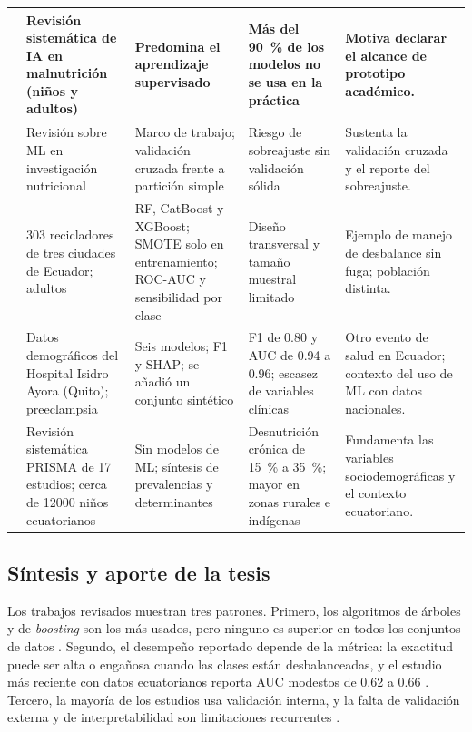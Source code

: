 \begin{longtable}{|R{1.1cm}|R{2.7cm}|R{2.9cm}|R{2.7cm}|R{2.7cm}|}
  \cite{JANSSEN2024100264} & Revisión sistemática de IA en malnutrición (niños y adultos) & Predomina el aprendizaje supervisado & Más del \SI{90}{\percent} de los modelos no se usa en la práctica & Motiva declarar el alcance de prototipo académico.\\ \hline
  \cite{KIRK20222573} & Revisión sobre ML en investigación nutricional & Marco de trabajo; validación cruzada frente a partición simple & Riesgo de sobreajuste sin validación sólida & Sustenta la validación cruzada y el reporte del sobreajuste.\\ \hline
  \cite{ijerph23020240} & \num{303} recicladores de tres ciudades de Ecuador; adultos & RF, CatBoost y XGBoost; SMOTE solo en entrenamiento; ROC-AUC y sensibilidad por clase & Diseño transversal y tamaño muestral limitado & Ejemplo de manejo de desbalance sin fuga; población distinta.\\ \hline
  \cite{diagnostics16142147} & Datos demográficos del Hospital Isidro Ayora (Quito); preeclampsia & Seis modelos; F1 y SHAP; se añadió un conjunto sintético & F1 de 0.80 y AUC de 0.94 a 0.96; escasez de variables clínicas & Otro evento de salud en Ecuador; contexto del uso de ML con datos nacionales.\\ \hline
  \cite{nu17223608} & Revisión sistemática PRISMA de 17 estudios; cerca de \num{12000} niños ecuatorianos & Sin modelos de ML; síntesis de prevalencias y determinantes & Desnutrición crónica de \SI{15}{\percent} a \SI{35}{\percent}; mayor en zonas rurales e indígenas & Fundamenta las variables sociodemográficas y el contexto ecuatoriano.\\ \hline
\end{longtable}
\endgroup



\subsection{Síntesis y aporte de la tesis}
Los trabajos revisados muestran tres patrones. Primero, los algoritmos de árboles y de \textit{boosting} son los más usados, pero ninguno es superior en todos los conjuntos de datos \cite{11355002}. Segundo, el desempeño reportado depende de la métrica: la exactitud puede ser alta o engañosa cuando las clases están desbalanceadas, y el estudio más reciente con datos ecuatorianos reporta AUC modestos de 0.62 a 0.66 \cite{nu18142232}. Tercero, la mayoría de los estudios usa validación interna, y la falta de validación externa y de interpretabilidad son limitaciones recurrentes \cite{Indrisari_Febiansyah_Adiwinoto_2025,JANSSEN2024100264}.

